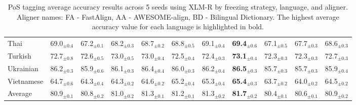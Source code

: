 \begin{table*}[ht]
{\begin{tabular}{lcccccccccc}
Thai & 69.0$_{\pm 0.4}$ & 67.2$_{\pm 0.1}$ & 68.2$_{\pm 0.3}$ & 68.7$_{\pm 0.2}$ & 68.8$_{\pm 0.5}$ & 69.1$_{\pm 0.4}$ & \textbf{69.4}$_{\pm 0.6}$ & 67.1$_{\pm 0.5}$ & 67.7$_{\pm 0.3}$ & 68.6$_{\pm 0.3}$ \\
Turkish & 72.7$_{\pm 0.8}$ & 72.6$_{\pm 0.5}$ & 73.0$_{\pm 0.5}$ & 73.0$_{\pm 0.4}$ & 72.5$_{\pm 0.4}$ & 72.4$_{\pm 0.3}$ & \textbf{73.1}$_{\pm 0.4}$ & 72.3$_{\pm 0.3}$ & 72.3$_{\pm 0.3}$ & 72.7$_{\pm 0.3}$ \\
Ukrainian & 86.2$_{\pm 0.3}$ & 85.9$_{\pm 0.6}$ & 86.1$_{\pm 0.3}$ & 86.4$_{\pm 0.4}$ & 86.0$_{\pm 0.3}$ & 86.2$_{\pm 0.4}$ & \textbf{86.5}$_{\pm 0.3}$ & 85.7$_{\pm 0.3}$ & 85.7$_{\pm 0.3}$ & 85.9$_{\pm 0.4}$ \\
Vietnamese & 64.7$_{\pm 0.6}$ & 64.3$_{\pm 0.4}$ & 64.3$_{\pm 0.2}$ & 64.6$_{\pm 0.2}$ & 65.2$_{\pm 0.4}$ & 65.3$_{\pm 0.4}$ & \textbf{65.4}$_{\pm 0.3}$ & 63.7$_{\pm 0.2}$ & 64.0$_{\pm 0.2}$ & 64.5$_{\pm 0.2}$ \\
\hline
Average & 80.9$_{\pm 0.1}$ & 80.8$_{\pm 0.2}$ & 81.0$_{\pm 0.2}$ & 81.3$_{\pm 0.1}$ & 81.2$_{\pm 0.1}$ & 81.3$_{\pm 0.2}$ & \textbf{81.7}$_{\pm 0.2}$ & 80.4$_{\pm 0.1}$ & 80.6$_{\pm 0.1}$ & 80.9$_{\pm 0.2}$ \\

        \bottomrule
        \end{tabular}
        }
        \caption{PoS tagging average accuracy results across 5 seeds using XLM-R by freezing strategy, language, and aligner. Aligner names: FA - FastAlign, AA - AWESOME-align, BD - Bilingual Dictionary. The highest average accuracy value for each language is highlighted in bold.}
        \label{table:results_XLM-R_PoS-tagging_before}
        \end{table*}
        